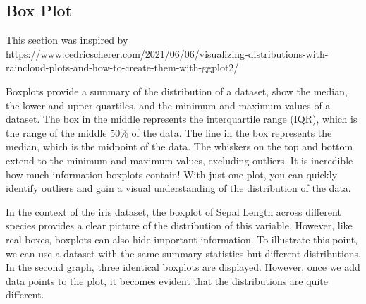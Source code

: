 \documentclass[
  letterpaper,
]{book}
\begin{document}
\hypertarget{box-plot}{%
\subsection{Box Plot}\label{box-plot}}

This section was inspired by
https://www.cedricscherer.com/2021/06/06/visualizing-distributions-with-raincloud-plots-and-how-to-create-them-with-ggplot2/

Boxplots provide a summary of the distribution of a dataset, show the
median, the lower and upper quartiles, and the minimum and maximum
values of a dataset. The box in the middle represents the interquartile
range (IQR), which is the range of the middle 50\% of the data. The line
in the box represents the median, which is the midpoint of the data. The
whiskers on the top and bottom extend to the minimum and maximum values,
excluding outliers. It is incredible how much information boxplots
contain! With just one plot, you can quickly identify outliers and gain
a visual understanding of the distribution of the data.

In the context of the iris dataset, the boxplot of Sepal Length across
different species provides a clear picture of the distribution of this
variable. However, like real boxes, boxplots can also hide important
information. To illustrate this point, we can use a dataset with the
same summary statistics but different distributions. In the second
graph, three identical boxplots are displayed. However, once we add data
points to the plot, it becomes evident that the distributions are quite
different.
\end{document}
